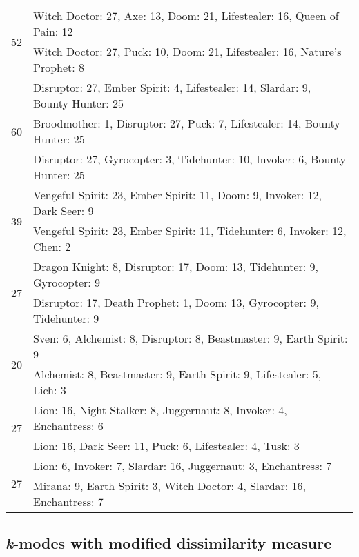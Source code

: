 \documentclass[result.tex]{subfiles}
\begin{document}
\begin{table}[H]
\begin{tabular}{ | c | p{12.5cm} | }
    \multirow{2}{*}{52}
    & Witch Doctor: 27, Axe: 13, Doom: 21, Lifestealer: 16, Queen of Pain: 12 \\
    & Witch Doctor: 27, Puck: 10, Doom: 21, Lifestealer: 16, Nature's Prophet: 8 \\
    \hline
    \multirow{3}{*}{60}
    & Disruptor: 27, Ember Spirit: 4, Lifestealer: 14, Slardar: 9, Bounty Hunter: 25 \\
    & Broodmother: 1, Disruptor: 27, Puck: 7, Lifestealer: 14, Bounty Hunter: 25 \\
    & Disruptor: 27, Gyrocopter: 3, Tidehunter: 10, Invoker: 6, Bounty Hunter: 25 \\
    \hline
    \multirow{2}{*}{39}
    & Vengeful Spirit: 23, Ember Spirit: 11, Doom: 9, Invoker: 12, Dark Seer: 9 \\
    & Vengeful Spirit: 23, Ember Spirit: 11, Tidehunter: 6, Invoker: 12, Chen: 2 \\
    \hline
    \multirow{2}{*}{27}
    & Dragon Knight: 8, Disruptor: 17, Doom: 13, Tidehunter: 9, Gyrocopter: 9 \\
    & Disruptor: 17, Death Prophet: 1, Doom: 13, Gyrocopter: 9, Tidehunter: 9 \\
    \hline
    \multirow{2}{*}{20}
    & Sven: 6, Alchemist: 8, Disruptor: 8, Beastmaster: 9, Earth Spirit: 9 \\
    & Alchemist: 8, Beastmaster: 9, Earth Spirit: 9, Lifestealer: 5, Lich: 3 \\
    \hline
    \multirow{2}{*}{27}
    & Lion: 16, Night Stalker: 8, Juggernaut: 8, Invoker: 4, Enchantress: 6 \\
    & Lion: 16, Dark Seer: 11, Puck: 6, Lifestealer: 4, Tusk: 3 \\
    \hline
    \multirow{2}{*}{27}
    & Lion: 6, Invoker: 7, Slardar: 16, Juggernaut: 3, Enchantress: 7 \\
    & Mirana: 9, Earth Spirit: 3, Witch Doctor: 4, Slardar: 16, Enchantress: 7 \\
    \hline
  \end{tabular}
  \caption{}
  \label{}
\end{table}

\newpage

\subsection*{\textit{k}-modes with modified dissimilarity measure}
\end{document}
